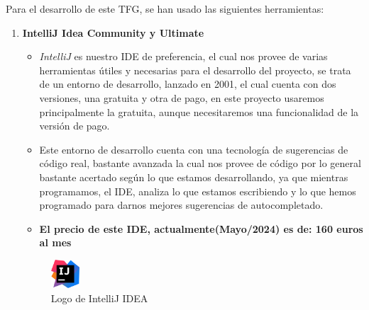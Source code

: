 \documentclass[a4paper]{article}
\begin{document}
Para el desarrollo de este TFG, se han usado las siguientes herramientas:
\begin{enumerate}
    \item \textbf{IntelliJ Idea Community y Ultimate}
          \begin{itemize}
              \item \textit{IntelliJ} es nuestro IDE de preferencia, el cual nos provee de varias herramientas útiles y necesarias para el desarrollo del proyecto, se trata de un entorno de desarrollo, lanzado en 2001, el cual cuenta con dos versiones, una gratuita y otra de pago, en este proyecto usaremos principalmente la gratuita, aunque necesitaremos una funcionalidad de la versión de pago.
              \item Este entorno de desarrollo cuenta con una tecnología de sugerencias de código real, bastante avanzada la cual nos provee de código por lo general bastante acertado según lo que estamos desarrollando, ya que mientras programamos, el IDE, analiza lo que estamos escribiendo y lo que hemos programado para darnos mejores sugerencias de autocompletado.
              \item \textbf{El precio de este IDE, actualmente(Mayo/2024) es de: 160 euros al mes}
          \end{itemize}
          \begin{figure}[!ht]
            \centering
            \includegraphics[width=0.1\textwidth]{Images/IntelliJ_IDEA_Icon.svg.png} 
            \caption{Logo de IntelliJ IDEA}
            \label{fig:intellij}
        \end{figure}
        

\end{enumerate}
\end{document}
